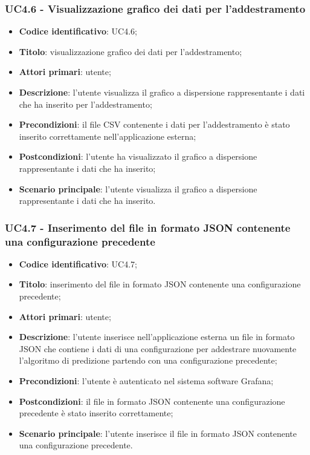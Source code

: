 \subsubsection{UC4.6 - Visualizzazione grafico dei dati per l'addestramento}
\begin{itemize}
	\item \textbf{Codice identificativo}: UC4.6;
	\item \textbf{Titolo}: visualizzazione grafico dei dati per l'addestramento;
	\item \textbf{Attori primari}: utente;
	\item \textbf{Descrizione}: l'utente visualizza il grafico a dispersione rappresentante i dati che ha inserito per l'addestramento;
	\item \textbf{Precondizioni}: il file CSV contenente i dati per l'addestramento è stato inserito correttamente nell'applicazione esterna;
	\item \textbf{Postcondizioni}: l'utente ha visualizzato il grafico a dispersione rappresentante i dati che ha inserito;
	\item \textbf{Scenario principale}: l'utente visualizza il grafico a dispersione rappresentante i dati che ha inserito.
\end{itemize}
\subsubsection{UC4.7 - Inserimento del file in formato JSON contenente una configurazione precedente}
\begin{itemize}
	\item \textbf{Codice identificativo}: UC4.7;
	\item \textbf{Titolo}: inserimento del file in formato JSON contenente una configurazione precedente;
	\item \textbf{Attori primari}: utente;
	\item \textbf{Descrizione}: l'utente inserisce nell'applicazione esterna un file in formato JSON che contiene i dati di una configurazione per addestrare nuovamente l'algoritmo di predizione partendo con una configurazione precedente;
	\item \textbf{Precondizioni}: l'utente è autenticato nel sistema software Grafana\glo;
	\item \textbf{Postcondizioni}: il file in formato JSON contenente una configurazione precedente è stato inserito correttamente;
	\item \textbf{Scenario principale}: l'utente inserisce il file in formato JSON contenente una configurazione precedente.
\end{itemize}
